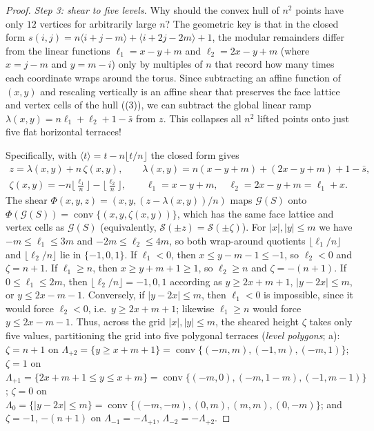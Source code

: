 \begin{proof}
\emph{Step 3: shear to five levels.}
Why should the convex hull of $n^2$ points have only $12$ vertices for arbitrarily large $n$? The geometric key is that in the closed form $s(i,j)=n\langle i+j-m\rangle+\langle i+2j-2m\rangle+1$, the modular remainders differ from the linear functions $\ell_1=x-y+m$ and $\ell_2=2x-y+m$ (where $x=j-m$ and $y=m-i$) only by multiples of $n$ that record how many times each coordinate wraps around the torus. Since subtracting an affine function of $(x,y)$ and rescaling vertically is an affine shear that preserves the face lattice and vertex cells of the hull ((3)), we can subtract the global linear ramp $\lambda(x,y)=n\ell_1+\ell_2+1-\bar s$ from $z$. This collapses all $n^2$ lifted points onto just five flat horizontal terraces!

Specifically, with $\langle t\rangle=t-n\lfloor t/n\rfloor$ the closed form gives
\begin{gather*}
z=\lambda(x,y)+n\,\zeta(x,y),\qquad \lambda(x,y)=n(x-y+m)+(2x-y+m)+1-\bar s,\\
\zeta(x,y)=-n\Big\lfloor\tfrac{\ell_1}{n}\Big\rfloor-\Big\lfloor\tfrac{\ell_2}{n}\Big\rfloor,\qquad \ell_1=x-y+m,\quad \ell_2=2x-y+m=\ell_1+x .
\end{gather*}
The shear $\Phi(x,y,z)=(x,y,(z-\lambda(x,y))/n)$ maps $\mathcal G(S)$ onto $\Phi(\mathcal G(S))=\operatorname{conv}\{(x,y,\zeta(x,y))\}$, which has the same face lattice and vertex cells as $\mathcal G(S)$ (equivalently, $\mathcal S(\pm z)=\mathcal S(\pm\zeta)$).
For $|x|,|y|\le m$ we have $-m\le\ell_1\le3m$ and $-2m\le\ell_2\le4m$, so both wrap-around quotients $\lfloor\ell_1/n\rfloor$ and $\lfloor\ell_2/n\rfloor$ lie in $\{-1,0,1\}$.
If $\ell_1<0$, then $x\le y-m-1\le-1$, so $\ell_2<0$ and $\zeta=n+1$.
If $\ell_1\ge n$, then $x\ge y+m+1\ge1$, so $\ell_2\ge n$ and $\zeta=-(n+1)$.
If $0\le\ell_1\le2m$, then $\lfloor\ell_2/n\rfloor=-1,0,1$ according as $y\ge2x+m+1$, $|y-2x|\le m$, or $y\le2x-m-1$.
Conversely, if $|y-2x|\le m$, then $\ell_1<0$ is impossible, since it would force $\ell_2<0$, i.e.\ $y\ge2x+m+1$; likewise $\ell_1\ge n$ would force $y\le2x-m-1$.
Thus, across the grid $|x|,|y|\le m$, the sheared height $\zeta$ takes only five values, partitioning the grid into five polygonal terraces (\emph{level polygons}; a):
$\zeta=n+1$ on $\Lambda_{+2}=\{y\ge x+m+1\}=\operatorname{conv}\{(-m,m),(-1,m),(-m,1)\}$;
$\zeta=1$ on $\Lambda_{+1}=\{2x+m+1\le y\le x+m\}=\operatorname{conv}\{(-m,0),(-m,1-m),(-1,m-1)\}$;
$\zeta=0$ on $\Lambda_{0}=\{|y-2x|\le m\}=\operatorname{conv}\{(-m,-m),(0,m),(m,m),(0,-m)\}$;
and $\zeta=-1$, $-(n+1)$ on $\Lambda_{-1}=-\Lambda_{+1}$, $\Lambda_{-2}=-\Lambda_{+2}$.


\end{proof}

